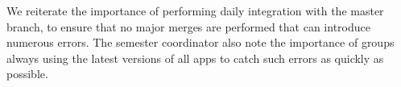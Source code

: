 We reiterate the importance of performing daily integration with the master branch, to ensure that no major merges are performed that can introduce numerous errors. The semester coordinator also note the importance of \gui groups always using the latest versions of all apps to catch such errors as quickly as possible.
